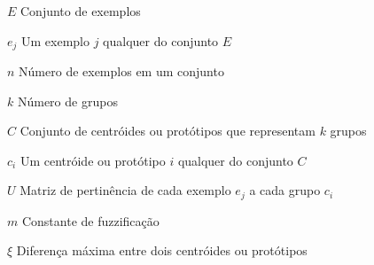 \begin{simbolos}
  \item[$ E $] Conjunto de exemplos
  \item[$ e_{j} $] Um exemplo $j$ qualquer do conjunto $E$
  \item[$ n $] Número de exemplos em um conjunto
  \item[$ k $] Número de grupos
  \item[$ C $] Conjunto de centróides ou protótipos que representam $k$ grupos
  \item[$ c_{i} $] Um centróide ou protótipo $i$ qualquer do conjunto $C$
  \item[$ U $] Matriz de pertinência de cada exemplo $e_{j}$ a cada grupo $c_{i}$
  \item[$ m $] Constante de fuzzificação
  \item[$ \xi $] Diferença máxima entre dois centróides ou protótipos
\end{simbolos}